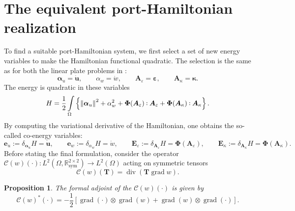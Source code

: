 \documentclass{ifacconf}
\DeclareMathOperator*{\grad}{grad}
\renewcommand{\div}{\operatorname{div}}
\newcommand{\bbR}{\mathbb{R}}
\newcommand*{\norm}[1]{\ensuremath{\left\|#1\right\|}}
\newtheorem{proposition}{Proposition}
\def\onedot{$\mathsurround0pt\ldotp$}
\def\cddot{%
	\mathbin{\vcenter{\baselineskip.67ex
			\hbox{\onedot}\hbox{\onedot}}%
}}
\begin{document}
\section{The equivalent port-Hamiltonian realization}
To find a suitable port-Hamiltonian system, we first select a set of new energy variables to make the Hamiltonian functional quadratic. The selection is the same as for both the linear plate problems in \cite{brugnoli2019mindlin,brugnoli2019kirchhoff}:
\begin{equation}
	\bm{\alpha}_u = \dot{\bm{u}}, \qquad \alpha_w = \dot{w}, \qquad \bm{A}_\varepsilon = \bm{\varepsilon}, \qquad \bm{A}_\kappa = \bm{\kappa}.
\end{equation}
The energy is quadratic in these variables
\begin{equation}
	H = \frac{1}{2} \int_{\Omega} \left\{\norm{\bm{\alpha}_u}^2 + \alpha_w^2 + \bm{\Phi}(\bm{A}_\varepsilon) \cddot \bm{A}_\varepsilon + \bm{\Phi}(\bm{A}_\kappa) \cddot \bm{A}_\kappa \right\}.
\end{equation}
By computing the variational derivative of the Hamiltonian, one obtains the so-called co-energy variables:
\begin{equation}
	\bm{e}_u := \delta_{\bm\alpha_u} H = \dot{\bm{u}}, \qquad \bm{e}_w := \delta_{\alpha_w} H = \dot{w}, \qquad \bm{E}_\varepsilon := \delta_{\bm{A}_\varepsilon} H = \bm{\Phi}(\bm{A}_\varepsilon), \qquad \bm{E}_\kappa := \delta_{\bm{A}_\kappa} H = \bm{\Phi}(\bm{A}_\kappa).
\end{equation}
Before stating the final formulation, consider the operator $\mathcal{C}(w)(\cdot): L^2(\Omega, \bbR^{2\times 2}_{\text{sym}}) \rightarrow L^2(\Omega)$ acting on symmetric tensors 
\begin{equation}
	\mathcal{C}(w)(\bm{T}) = \div(\bm{T} \grad w).
\end{equation}
\begin{proposition}\label{prop:adjC}
	The formal adjoint of the $\mathcal{C}(w)(\cdot)$ is given by
	\begin{equation}
		\mathcal{C}(w)^*(\cdot) = -\frac{1}{2} \left[\grad (\cdot) \otimes \grad(w) + \grad(w) \otimes \grad(\cdot) \right] .
	\end{equation}
\end{proposition}
\end{document}
